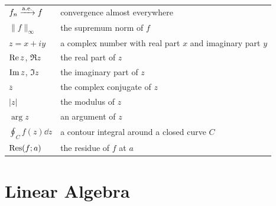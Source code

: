 {\begin{longtable}{@{}L{0.27\textwidth}L{0.65\textwidth}@{}}
        $f_n\xrightarrow{\mathrm{a.e.}} f$ & convergence almost everywhere \\
        $\|f\|_\infty$ & the supremum norm of $f$ \\
        $z=x+iy$ & a complex number with real part $x$ and imaginary part $y$ \\
        $\operatorname{Re} z$, $\Re z$ & the real part of $z$ \\
        $\operatorname{Im} z$, $\Im z$ & the imaginary part of $z$ \\
        $\overline{z}$ & the complex conjugate of $z$ \\
        $|z|$ & the modulus of $z$ \\
        $\arg z$ & an argument of $z$ \\
        $\displaystyle\oint_C f(z)\dd z$ & a contour integral around a closed curve $C$ \\
        $\operatorname*{Res}(f;a)$ & the residue of $f$ at $a$ \\
    \end{longtable}
    }

    \section*{Linear Algebra}

